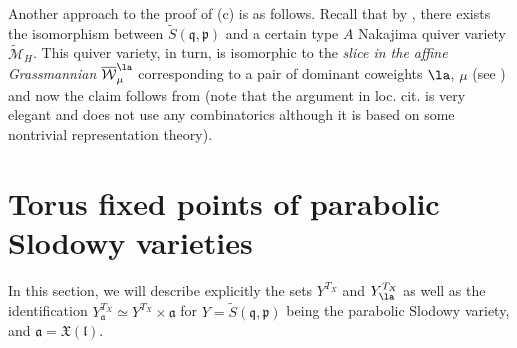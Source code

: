 \documentclass[12pt]{amsart}
\begin{document}
\begin{rmk}
Another approach to the proof of (c) is as follows. Recall that by \cite{maffei}, there exists the isomorphism between $\widetilde{S}(\mathfrak{q},\mathfrak{p})$ and a certain type $A$ Nakajima quiver variety $\widetilde{\mathcal{M}}_H$. This quiver variety, in turn, is isomorphic to the {\em{slice in the affine Grassmannian}} $\overline{\mathcal{W}}^\la_\mu$ corresponding to a pair of dominant coweights $\la$, $\mu$ (see \cite{MV}) and now the claim follows from \cite[Equation (20)]{KamnitzerTingleyWebsterWeeksYacobi} (note that the argument in loc. cit. is very elegant and does not use any combinatorics although it is based on some nontrivial representation theory).  
\end{rmk}













\section{Torus fixed points of parabolic Slodowy varieties}\label{app_torus_fixed}



In this section, we will describe explicitly the sets $Y^{T_X}$ and $Y_\la^{T_X}$ as well as the identification $Y_{\mathfrak{a}}^{T_X} \simeq Y^{T_X} \times \mathfrak{a}$ for $Y=\widetilde{S}(\mathfrak{q},\mathfrak{p})$ being the parabolic Slodowy variety, and $\mathfrak{a}=\mathfrak{X}(\mathfrak{l})$. 
\end{document}
